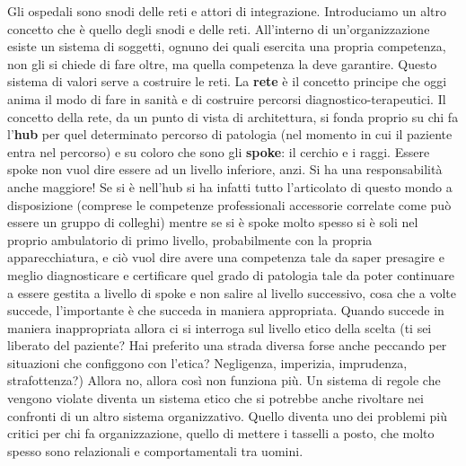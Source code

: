 \documentclass[]{article}
\begin{document}
Gli ospedali sono snodi delle reti e attori di integrazione.
Introduciamo un altro concetto che è quello degli snodi e delle reti.
All'interno di un'organizzazione esiste un sistema di soggetti, ognuno
dei quali esercita una propria competenza, non gli si chiede di fare
oltre, ma quella competenza la deve garantire. Questo sistema di valori
serve a costruire le reti. La \textbf{rete} è il concetto principe che
oggi anima il modo di fare in sanità e di costruire percorsi
diagnostico-terapeutici. Il concetto della rete, da un punto di vista di
architettura, si fonda proprio su chi fa l'\textbf{hub} per quel
determinato percorso di patologia (nel momento in cui il paziente entra
nel percorso) e su coloro che sono gli \textbf{spoke}: il cerchio e i
raggi. Essere spoke non vuol dire essere ad un livello inferiore, anzi.
Si ha una responsabilità anche maggiore! Se si è nell'hub si ha infatti
tutto l'articolato di questo mondo a disposizione (comprese le
competenze professionali accessorie correlate come può essere un gruppo
di colleghi) mentre se si è spoke molto spesso si è soli nel proprio
ambulatorio di primo livello, probabilmente con la propria
apparecchiatura, e ciò vuol dire avere una competenza tale da saper
presagire e meglio diagnosticare e certificare quel grado di patologia
tale da poter continuare a essere gestita a livello di spoke e non
salire al livello successivo, cosa che a volte succede, l'importante è
che succeda in maniera appropriata. Quando succede in maniera
inappropriata allora ci si interroga sul livello etico della scelta (ti
sei liberato del paziente? Hai preferito una strada diversa forse anche
peccando per situazioni che configgono con l'etica? Negligenza,
imperizia, imprudenza, strafottenza?) Allora no, allora così non
funziona più. Un sistema di regole che vengono violate diventa un
sistema etico che si potrebbe anche rivoltare nei confronti di un altro
sistema organizzativo. Quello diventa uno dei problemi più critici per
chi fa organizzazione, quello di mettere i tasselli a posto, che molto
spesso sono relazionali e comportamentali tra uomini.
\end{document}
